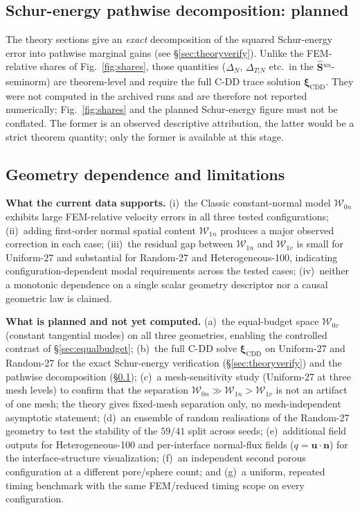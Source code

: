 \documentclass[11pt,a4paper]{article}
\newcommand{\Schur}{\mathbf{S}}
\newcommand{\Shatuu}{\widehat{\Schur}{}^{uu}}
\newcommand{\Wspace}{\mathcal{W}}
\newcommand{\xiX}[1]{\bm{\xi}_{#1}}
\begin{document}
\subsection{Schur-energy pathwise decomposition: planned}
\label{sec:schurdecomp}

The theory sections give an \emph{exact} decomposition of the squared
Schur-energy error into pathwise marginal gains (see \S\ref{sec:theoryverify}).  Unlike
the FEM-relative shares of Fig.~\ref{fig:shares}, those quantities
($\Delta_N$, $\Delta_{T|N}$ etc.\ in the $\Shatuu$-seminorm) are
theorem-level and require the full C-DD trace solution
$\xiX{\mathrm{CDD}}$.  They were not computed in the archived runs and
are therefore not reported numerically; Fig.~\ref{fig:shares} and the
planned Schur-energy figure must not be conflated.  The former is an
observed descriptive attribution, the latter would be a strict theorem
quantity; only the former is available at this stage.

\subsection{Geometry dependence and limitations}
\label{sec:limitations}

\textbf{What the current data supports.}  (i)~the Classic
constant-normal model $\Wspace_{0n}$ exhibits large FEM-relative
velocity errors in all three tested configurations; (ii)~adding
first-order normal spatial content $\Wspace_{1n}$ produces a major
observed correction in each case; (iii)~the residual gap between
$\Wspace_{1n}$ and $\Wspace_{1v}$ is small for Uniform-27 and
substantial for Random-27 and Heterogeneous-100, indicating
configuration-dependent modal requirements across the tested cases;
(iv)~neither a monotonic dependence on a single scalar geometry
descriptor nor a causal geometric law is claimed.

\textbf{What is planned and not yet computed.}  (a)~the equal-budget
space $\Wspace_{0v}$ (constant tangential modes) on all three
geometries, enabling the controlled contrast of \S\ref{sec:equalbudget};
(b)~the full C-DD solve $\xiX{\mathrm{CDD}}$ on Uniform-27 and
Random-27 for the exact Schur-energy verification (\S\ref{sec:theoryverify}) and the
pathwise decomposition (\S\ref{sec:schurdecomp}); (c)~a mesh-sensitivity study
(Uniform-27 at three mesh levels) to confirm that the separation
$\Wspace_{0n}\gg\Wspace_{1n}>\Wspace_{1v}$ is not an artifact of one
mesh; the theory gives fixed-mesh separation only, no
mesh-independent asymptotic statement; (d)~an ensemble of random
realisations of the Random-27 geometry to test the stability of the
$59/41$ split across seeds; (e)~additional field outputs for
Heterogeneous-100 and per-interface normal-flux fields
($q=\mathbf{u}\cdot\mathbf{n}$) for the interface-structure
visualization; (f)~an independent second porous configuration at a
different pore/sphere count; and (g)~a uniform, repeated timing benchmark
with the same FEM/reduced timing scope on every configuration.
\end{document}
